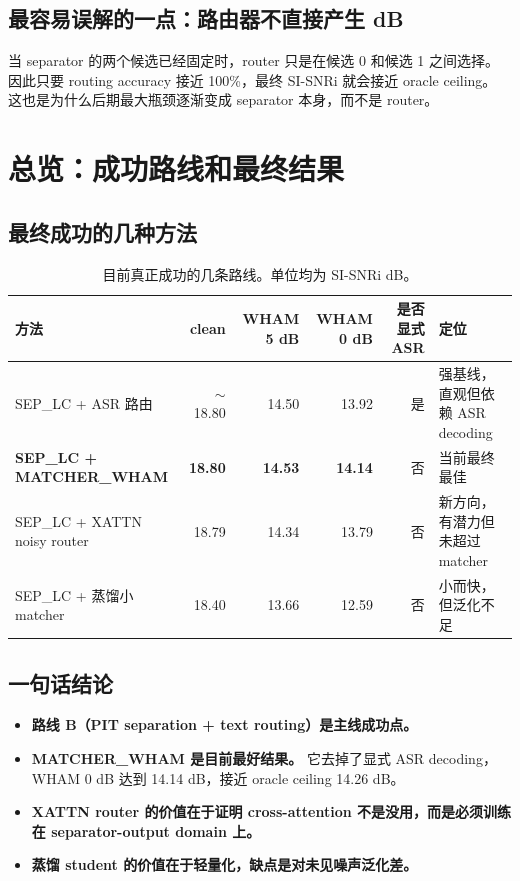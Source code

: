 \documentclass[UTF8,zihao=-4]{ctexart}
\begin{document}
\subsection{最容易误解的一点：路由器不直接产生 dB}

当 separator 的两个候选已经固定时，router 只是在候选 0 和候选 1 之间选择。
因此只要 routing accuracy 接近 100\%，最终 SI-SNRi 就会接近 oracle ceiling。
这也是为什么后期最大瓶颈逐渐变成 separator 本身，而不是 router。

\section{总览：成功路线和最终结果}

\subsection{最终成功的几种方法}

\begin{table}[h]
\centering
\begin{tabularx}{\linewidth}{lrrrrX}
\toprule
方法 & clean & WHAM 5 dB & WHAM 0 dB & 是否显式 ASR & 定位 \\
\midrule
SEP\_LC + ASR 路由 & $\sim$18.80 & 14.50 & 13.92 & 是 & 强基线，直观但依赖 ASR decoding \\
\textbf{SEP\_LC + MATCHER\_WHAM} & \textbf{18.80} & \textbf{14.53} & \textbf{14.14} & 否 & 当前最终最佳 \\
SEP\_LC + XATTN noisy router & 18.79 & 14.34 & 13.79 & 否 & 新方向，有潜力但未超过 matcher \\
SEP\_LC + 蒸馏小 matcher & 18.40 & 13.66 & 12.59 & 否 & 小而快，但泛化不足 \\
\bottomrule
\end{tabularx}
\caption{目前真正成功的几条路线。单位均为 SI-SNRi dB。}
\end{table}

\subsection{一句话结论}

\begin{itemize}
  \item \textbf{路线 B（PIT separation + text routing）是主线成功点。}
  \item \textbf{MATCHER\_WHAM 是目前最好结果。} 它去掉了显式 ASR decoding，WHAM 0 dB 达到 14.14 dB，接近 oracle ceiling 14.26 dB。
  \item \textbf{XATTN router 的价值在于证明 cross-attention 不是没用，而是必须训练在 separator-output domain 上。}
  \item \textbf{蒸馏 student 的价值在于轻量化，缺点是对未见噪声泛化差。}
\end{itemize}
\end{document}
